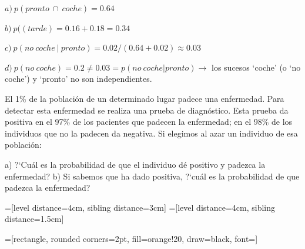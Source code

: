 $a)\ p(pronto\ \cap \ coche)=0.64$

$b)\ p((tarde)=0.16+0.18=0.34$

$c)\ p(no \ coche\ | \ pronto)= 0.02/(0.64+0.02)\approx 0.03$

$d)\ p(no \ coche)=0.2 \neq 0.03 = p(no \ coche|pronto) \to$ los sucesos `coche' (o `no coche') y `pronto' no son independientes.

\vspace{5mm}
\begin{ejemplo}
\begin{ejer}
El 1\% de la población de un determinado lugar padece una enfermedad. Para detectar esta enfermedad se realiza una prueba de diagnóstico. Esta prueba da positiva en el 97\% de los pacientes que padecen la enfermedad; en el 98\% de los individuos que no la padecen da negativa. Si elegimos al azar un individuo de esa población:

a) ?`Cuál es la probabilidad de que el individuo dé positivo y padezca la enfermedad?
b) Si sabemos que ha dado positiva, ?`cuál es la probabilidad de que padezca la enfermedad?	
\end{ejer}
\end{ejemplo}

=[level distance=4cm, sibling distance=3cm]
=[level distance=4cm, sibling distance=1.5cm]

=[rectangle, rounded corners=2pt, fill=orange!20, draw=black, font=\small]

\begin{center}
\end{center}

